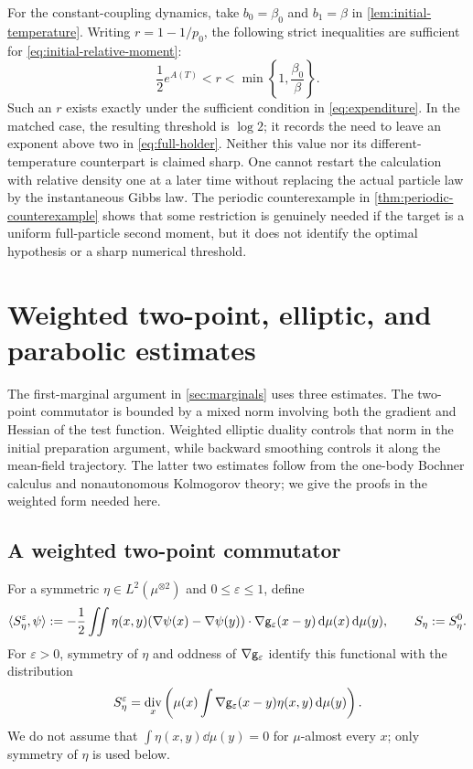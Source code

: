 \documentclass[11pt,reqno]{amsart}
\numberwithin{equation}{section}
\theoremstyle{plain}
\theoremstyle{remark}
\DeclareMathOperator{\diver}{div}
\begin{document}
For the constant-coupling dynamics, take $b_0=\beta_0$ and $b_1=\beta$ in \cref{lem:initial-temperature}. Writing $r=1-1/p_0$, the following strict inequalities are sufficient for \eqref{eq:initial-relative-moment}:
\begin{equation}\label{eq:temperature-exponent-choice}
 \frac12e^{A(T)}<r<\min\left\{1,\frac{\beta_0}{\beta}\right\}.
\end{equation}
Such an $r$ exists exactly under the sufficient condition in \eqref{eq:expenditure}. In the matched case, the resulting threshold is $\log2$; it records the need to leave an exponent above two in \eqref{eq:full-holder}. Neither this value nor its different-temperature counterpart is claimed sharp. One cannot restart the calculation with relative density one at a later time without replacing the actual particle law by the instantaneous Gibbs law. The periodic counterexample in \cref{thm:periodic-counterexample} shows that some restriction is genuinely needed if the target is a uniform full-particle second moment, but it does not identify the optimal hypothesis or a sharp numerical threshold.

\par\endgroup

\begingroup

\section{Weighted two-point, elliptic, and parabolic estimates}\label{sec:weighted}

The first-marginal argument in \cref{sec:marginals} uses three estimates. The two-point commutator is bounded by a mixed norm involving both the gradient and Hessian of the test function. Weighted elliptic duality controls that norm in the initial preparation argument, while backward smoothing controls it along the mean-field trajectory. The latter two estimates follow from the one-body Bochner calculus and nonautonomous Kolmogorov theory; we give the proofs in the weighted form needed here.

\subsection{A weighted two-point commutator}
For a symmetric $\eta\in L^2(\mu^{\otimes2})$ and $0\le\varepsilon\le1$, define
\begin{equation}\label{eq:two-point-form}
 \langle S_\eta^\varepsilon,\psi\rangle
 :=-\frac12\iint\eta(x,y)(\nabla\psi(x)-\nabla\psi(y))\cdot\nabla\mathsf g_\varepsilon(x-y)
          \,\mathrm d\mu(x)\,\mathrm d\mu(y),\qquad S_\eta:=S_\eta^0.
\end{equation}
For $\varepsilon>0$, symmetry of $\eta$ and oddness of $\nabla\mathsf g_\varepsilon$ identify this functional with the distribution
\begin{equation}\label{eq:two-point-divergence}
 S_\eta^\varepsilon
 =\diver_x\left(\mu(x)\int\nabla\g_\varepsilon(x-y)\eta(x,y)\dd\mu(y)\right).
\end{equation}
We do not assume that $\int\eta(x,y)\dd\mu(y)=0$ for $\mu$-almost every $x$; only symmetry of $\eta$ is used below.
\end{document}
